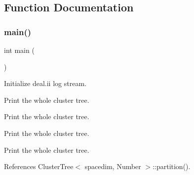 \subsection{Function Documentation}
\mbox{\label{cluster-tree-hp_8cc_ae66f6b31b5ad750f1fe042a706a4e3d4}} 
\subsubsection{\texorpdfstring{main()}{main()}}
{\footnotesize\ttfamily int main (\begin{DoxyParamCaption}{ }\end{DoxyParamCaption})}

Initialize deal.\+ii log stream.

Print the whole cluster tree.

Print the whole cluster tree.

Print the whole cluster tree.

Print the whole cluster tree.

References Cluster\+Tree$<$ spacedim, Number $>$\+::partition().

